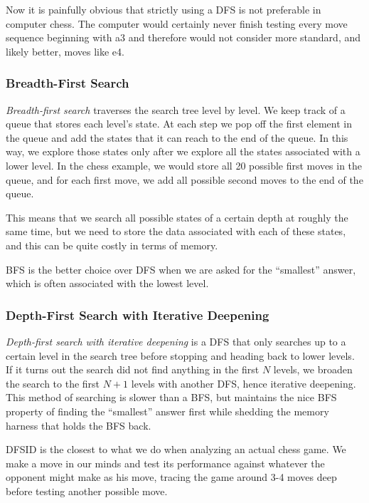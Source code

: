 \documentclass[11pt]{book}
\begin{document}
Now it is painfully obvious that strictly using a DFS is not preferable in computer chess. The computer would certainly never finish testing every move sequence beginning with a3 and therefore would not consider more standard, and likely better, moves like e4.

\subsubsection{Breadth-First Search}

\textit{Breadth-first search} traverses the search tree level by level. We keep track of a queue that stores each level's state. At each step we pop off the first element in the queue and add the states that it can reach to the end of the queue. In this way, we explore those states only after we explore all the states associated with a lower level. In the chess example, we would store all 20 possible first moves in the queue, and for each first move, we add all possible second moves to the end of the queue.

This means that we search all possible states of a certain depth at roughly the same time, but we need to store the data associated with each of these states, and this can be quite costly in terms of memory.

BFS is the better choice over DFS when we are asked for the ``smallest'' answer, which is often associated with the lowest level.

\subsubsection{Depth-First Search with Iterative Deepening}

\textit{Depth-first search with iterative deepening} is a DFS that only searches up to a certain level in the search tree before stopping and heading back to lower levels. If it turns out the search did not find anything in the first $N$ levels, we broaden the search to the first $N+1$ levels with another DFS, hence iterative deepening. This method of searching is slower than a BFS, but maintains the nice BFS property of finding the ``smallest'' answer first while shedding the memory harness that holds the BFS back.

DFSID is the closest to what we do when analyzing an actual chess game. We make a move in our minds and test its performance against whatever the opponent might make as his move, tracing the game around 3-4 moves deep before testing another possible move.
\end{document}
